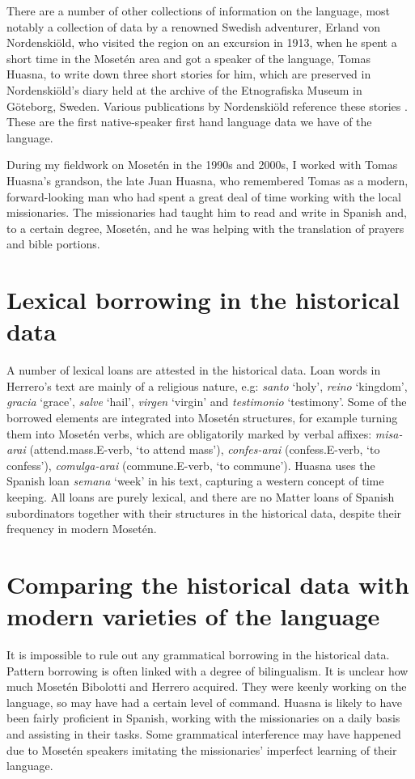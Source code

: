 \documentclass[output=paper,colorlinks,citecolor=brown
]{langscibook}
\begin{document}
There are a number of other collections of information on the language, most notably a collection of data by a renowned Swedish adventurer, Erland von Nordenskiöld, who visited the region on an excursion in 1913, when he spent a short time in the Mosetén area and got a speaker of the language, Tomas Huasna, to write down three short stories for him, which are preserved in Nordenskiöld's diary held at the archive of the Etnografiska Museum in Göteborg, Sweden. Various publications by Nordenskiöld reference these stories \citep{nordenskiold1924forschungen}. These are the first native-speaker first hand language data we have of the language.

During my fieldwork on Mosetén in the 1990s and 2000s, I worked with Tomas Huasna’s grandson, the late Juan Huasna, who remembered Tomas as a modern, forward-looking man who had spent a great deal of time working with the local missionaries. The missionaries had taught him to read and write in Spanish and, to a certain degree, Mosetén, and he was helping with the translation of prayers and bible portions. 

\section{Lexical borrowing in the historical data}
A number of lexical loans are attested in the historical data. Loan words in Herrero's text are mainly of a religious nature, e.g: \textit{santo} ‘holy’, \textit{reino} ‘kingdom’, \textit{gracia} ‘grace’, \textit{salve} ‘hail’, \textit{virgen} ‘virgin’ and \textit{testimonio} ‘testimony’. Some of the borrowed elements are integrated into Mosetén structures, for example turning them into Mosetén verbs, which are obligatorily marked by verbal affixes: 
\textit{misa-arai} (attend.mass.E-verb, ‘to attend mass’), \textit{confes-arai} (confess.E-verb, ‘to confess’), \textit{comulga-arai} (commune.E-verb, ‘to commune’). Huasna uses the Spanish loan \textit{semana} ‘week’ in his text, capturing a western concept of time keeping. All loans are purely lexical, and there are no Matter loans of Spanish subordinators together with their structures in the historical data, despite their frequency in modern Mosetén. 

\section{Comparing the historical data with modern varieties of the language}
It is impossible to rule out any grammatical borrowing in the historical data. Pattern borrowing is often linked with a degree of bilingualism. It is unclear how much Mosetén Bibolotti and Herrero acquired. They were keenly working on the language, so may have had a certain level of command. Huasna is likely to have been fairly proficient in Spanish, working with the missionaries on a daily basis and assisting in their tasks. Some grammatical interference may have happened due to Mosetén speakers imitating the missionaries' imperfect learning of their language.
\end{document}
